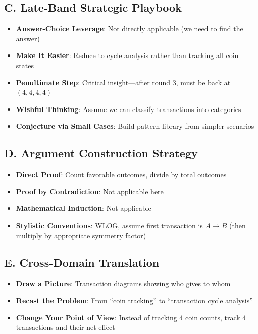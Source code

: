 \documentclass[]{article}
\begin{document}
\begin{strategicbox}
\subsection*{C. Late-Band Strategic Playbook}
\begin{itemize}[leftmargin=*]
    \item \textbf{Answer-Choice Leverage}: Not directly applicable (we need to find the answer)
    \item \textbf{Make It Easier}: Reduce to cycle analysis rather than tracking all coin states
    \item \textbf{Penultimate Step}: Critical insight---after round 3, must be back at $(4,4,4,4)$
    \item \textbf{Wishful Thinking}: Assume we can classify transactions into categories
    \item \textbf{Conjecture via Small Cases}: Build pattern library from simpler scenarios
\end{itemize}

\subsection*{D. Argument Construction Strategy}
\begin{itemize}[leftmargin=*]
    \item \textbf{Direct Proof}: Count favorable outcomes, divide by total outcomes
    \item \textbf{Proof by Contradiction}: Not applicable here
    \item \textbf{Mathematical Induction}: Not applicable
    \item \textbf{Stylistic Conventions}: WLOG, assume first transaction is $A \to B$ (then multiply by appropriate symmetry factor)
\end{itemize}

\subsection*{E. Cross-Domain Translation}
\begin{itemize}[leftmargin=*]
    \item \textbf{Draw a Picture}: Transaction diagrams showing who gives to whom
    \item \textbf{Recast the Problem}: From ``coin tracking'' to ``transaction cycle analysis''
    \item \textbf{Change Your Point of View}: Instead of tracking 4 coin counts, track 4 transactions and their net effect
\end{itemize}
\end{strategicbox}
\end{document}
